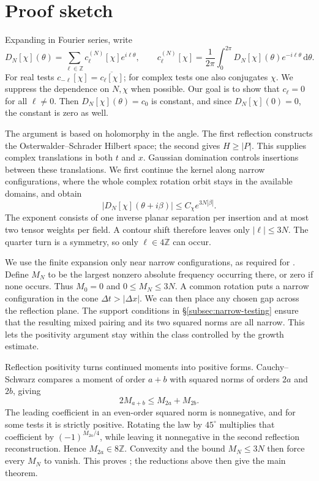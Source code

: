 \documentclass[11pt, letterpaper, reqno]{amsart}
\theoremstyle{definition}
\theoremstyle{remark}
\newcommand{\bbZ}{\mathbb{Z}}
\newcommand{\dd}{\,\mathrm{d}}
\begin{document}
\section{Proof sketch}\label{sec:sketch}

Expanding in Fourier series, write
\begin{equation}\label{eq:fourier_integral}
 D_N[\chi](\theta)=\sum_{\ell\in\bbZ}c_\ell^{(N)}[\chi]e^{i\ell\theta},
 \qquad c_\ell^{(N)}[\chi]=\frac1{2\pi}\int_0^{2\pi}
 D_N[\chi](\theta)e^{-i\ell\theta}\dd\theta.
\end{equation}
For real tests $c_{-\ell}[\chi]=\overline{c_\ell[\chi]}$; for complex
tests one also conjugates $\chi$. We suppress the dependence on $N,\chi$
when possible. Our goal is to show that $c_\ell=0$ for all $\ell\neq0$.
Then $D_N[\chi](\theta)=c_0$ is constant, and since $D_N[\chi](0)=0$,
the constant is zero as well.

The argument is based on holomorphy in the angle. The first reflection
constructs the Osterwalder--Schrader Hilbert space; the second gives
$H\geq|P|$. This supplies complex translations in both $t$ and $x$.
Gaussian domination controls insertions between these translations.
We first continue the kernel along narrow configurations, where the
whole complex rotation orbit stays in the available domains, and obtain
\begin{equation}\label{eq:angular-growth-preview}
 |D_N[\chi](\theta+i\beta)|\leq C_\chi e^{3N|\beta|}.
\end{equation}
The exponent consists of one inverse planar separation per insertion
and at most two tensor weights per field. A contour shift therefore
leaves only $|\ell|\leq3N$. The quarter turn is a symmetry, so only
$\ell\in4\bbZ$ can occur.

We use the finite expansion only near narrow configurations, as
required for . Define $M_N$ to be the largest
nonzero absolute frequency occurring there, or zero if none occurs.
Thus $M_0=0$ and $0\leq M_N\leq3N$. A common rotation puts a narrow
configuration in the cone $\Delta t>|\Delta x|$. We can then place
any chosen gap across the reflection plane. The support conditions
in \S\ref{subsec:narrow-testing} ensure that the resulting mixed
pairing and its two squared norms are all narrow. This lets the
positivity argument stay within the class controlled by the growth
estimate.

Reflection positivity turns continued moments into positive forms.
Cauchy--Schwarz compares a moment of order $a+b$ with squared norms of
orders $2a$ and $2b$, giving
\begin{equation}\label{eq:convexity-preview}
 2M_{a+b}\leq M_{2a}+M_{2b}.
\end{equation}
The leading coefficient in an even-order squared norm is nonnegative,
and for some tests it is strictly positive. Rotating the law by
$45^\circ$ multiplies that coefficient by $(-1)^{M_{2a}/4}$, while
leaving it nonnegative in the second reflection reconstruction. Hence
$M_{2a}\in8\bbZ$. Convexity and the bound $M_N\leq3N$ then force every
$M_N$ to vanish. This proves ; the reductions above
then give the main theorem.
\end{document}
